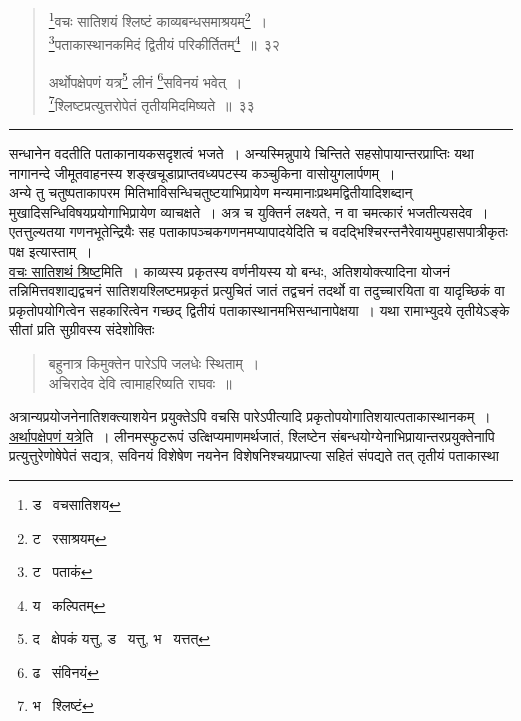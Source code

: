 \documentclass[11pt, openany]{book}
\begin{document}
\begin{quote}
{\na \renewcommand{\thefootnote}{1}\footnote{ड \textendash\ वचसातिशय}वचः सातिशयं श्लिष्टं काव्यबन्धसमाश्रयम्\renewcommand{\thefootnote}{2}\footnote{ट \textendash\ रसाश्रयम्}~।\\
\renewcommand{\thefootnote}{3}\footnote{ट \textendash\ पताकं}पताकास्थानकमिदं द्वितीयं परिकीर्तितम्\renewcommand{\thefootnote}{4}\footnote{य \textendash\ कल्पितम्}~॥~३२

अर्थोपक्षेपणं यत्र\renewcommand{\thefootnote}{5}\footnote{द \textendash\ क्षेपकं यत्तु, ड \textendash\ यत्तु, भ \textendash\ यत्तत्} लीनं \renewcommand{\thefootnote}{6}\footnote{ढ \textendash\ संविनयं}सविनयं भवेत्~।\\
\renewcommand{\thefootnote}{7}\footnote{भ \textendash\ श्लिष्टं}श्लिष्टप्रत्युत्तरोपेतं तृतीयमिदमिष्यते~॥~३३}
\end{quote}

\hrule

\vspace{2mm}
\noindent
सन्धानेन वदतीति पताकानायकसदृशत्वं भजते~। अन्यस्मिन्नुपाये चिन्तिते सहसोपायान्तरप्राप्तिः यथा नागानन्दे जीमूतवाहनस्य शङ्खचूडाप्राप्तवध्यपटस्य कञ्चुकिना वासोयुगलार्पणम्~।\\

अन्ये तु {\qt चतुष्पताकापरम} मितिभाविसन्धिचतुष्टयाभिप्रायेण मन्यमानाःप्रथमद्वितीयादिशब्दान् मुखादिसन्धिविषयप्रयोगाभिप्रायेण व्याचक्षते~। अत्र च युक्तिर्न लक्ष्यते, न वा चमत्कारं भजतीत्यसदेव~। एतत्तुल्यतया गणनभूतेन्द्रियैः सह पताकापञ्चकगणनमप्यापादयेदिति च वदद्भिश्चिरन्तनैरेवायमुपहासपात्रीकृतः पक्ष इत्यास्ताम्~।\\

\underline{वचः सातिशथं श्रिष्ट}मिति~। काव्यस्य प्रकृतस्य वर्णनीयस्य यो बन्धः, अतिशयोक्त्यादिना योजनं तन्निमित्तवशाद्यद्वचनं सातिशयश्लिष्टमप्रकृतं प्रत्युचितं जातं तद्वचनं तदर्थो वा तदुच्चारयिता वा यादृच्छिकं वा प्रकृतोपयोगित्वेन सहकारित्वेन गच्छद् द्वितीयं पताकास्थानमभिसन्धानापेक्षया~। यथा रामाभ्युदये तृतीयेऽङ्के सीतां प्रति सुग्रीवस्य संदेशोक्तिः \textendash

\begin{quote}
{\qt बहुनात्र किमुक्तेन पारेऽपि जलधेः स्थिताम्~।\\
अचिरादेव देवि त्वामाहरिष्यति राघवः~॥}
\end{quote}

\noindent
अत्रान्यप्रयोजनेनातिशक्त्याशयेन प्रयुक्तेऽपि वचसि पारेऽपीत्यादि प्रकृतोपयोगातिशयात्पताकास्थानकम्~।\\

\underline{अर्थापक्षेपणं यत्रे}ति~। लीनमस्फुटरूपं उत्क्षिप्यमाणमर्थजातं, श्लिष्टेन संबन्धयोग्येनाभिप्रायान्तरप्रयुक्तेनापि प्रत्युत्तुरेणोषेपेतं सद्यत्र, सविनयं विशेषेण नयनेन विशेषनिश्चयप्राप्त्या सहितं संपद्यते तत् तृतीयं पताकास्था \textendash
\end{document}
